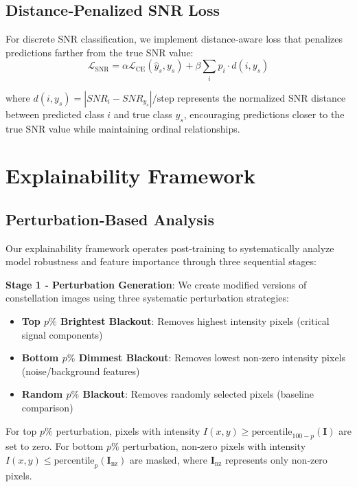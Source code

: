 \documentclass{ELSP}
\begin{document}
\subsection{Distance‑Penalized SNR Loss}

For discrete SNR classification, we implement distance‑aware loss that penalizes predictions farther from the true SNR value:
\begin{equation}
\mathcal{L}_{\text{SNR}} = \alpha \mathcal{L}_{\text{CE}}(\hat{y}_s, y_s) + \beta \sum_{i} p_i \cdot d(i, y_s)
\end{equation}

where $d(i, y_s) = |SNR_i - SNR_{y_s}| / \text{step}$ represents the normalized SNR distance between predicted class $i$ and true class $y_s$, encouraging predictions closer to the true SNR value while maintaining ordinal relationships.

\section{Explainability Framework}

\subsection{Perturbation‑Based Analysis}

Our explainability framework operates post‑training to systematically analyze model robustness and feature importance through three sequential stages:

\textbf{Stage 1 ‑ Perturbation Generation}: We create modified versions of constellation images using three systematic perturbation strategies:
\begin{itemize}
\item \textbf{Top $p\%$ Brightest Blackout}: Removes highest intensity pixels (critical signal components)
\item \textbf{Bottom $p\%$ Dimmest Blackout}: Removes lowest non‑zero intensity pixels (noise/background features)  
\item \textbf{Random $p\%$ Blackout}: Removes randomly selected pixels (baseline comparison)
\end{itemize}

For top $p\%$ perturbation, pixels with intensity $I(x,y) \geq \text{percentile}_{100-p}(\mathbf{I})$ are set to zero. For bottom $p\%$ perturbation, non‑zero pixels with intensity $I(x,y) \leq \text{percentile}_p(\mathbf{I}_{\text{nz}})$ are masked, where $\mathbf{I}_{\text{nz}}$ represents only non‑zero pixels.
\end{document}
